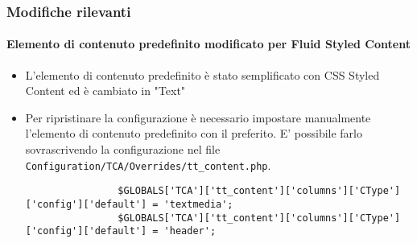 
\begin{frame}[fragile]
	\frametitle{Modifiche rilevanti}
	\framesubtitle{Elemento di contenuto predefinito modificato per Fluid Styled Content}

	\lstset{basicstyle=\tiny\ttfamily}

	\begin{itemize}
		\item L'elemento di contenuto predefinito è stato semplificato con CSS Styled Content ed è cambiato in "Text"
		\item Per ripristinare la configurazione è necessario impostare manualmente l'elemento di contenuto predefinito con il preferito.
			E' possibile farlo sovrascrivendo la configurazione nel file
			\texttt{Configuration/TCA/Overrides/tt\_content.php}.

			\begin{lstlisting}
				$GLOBALS['TCA']['tt_content']['columns']['CType']['config']['default'] = 'textmedia';
				$GLOBALS['TCA']['tt_content']['columns']['CType']['config']['default'] = 'header';
			\end{lstlisting}

	\end{itemize}

\end{frame}


